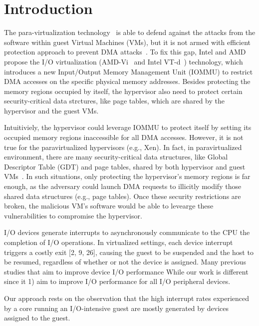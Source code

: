 \section{Introduction} \label{sec:intro}
The para-virtualization technology~\cite{XEN-SOPS03,denali-paravirtualization} is able to defend against the attacks from the software within guest Virtual Machines (VMs), but it is not armed with efficient protection approach to prevent DMA attacks~\cite{disaggregation}. 
To fix this gap, Intel and AMD propose the I/O virtualization (AMD-Vi~\cite{amdvt} and Intel VT-d~\cite{intelvt}) technology, which introduces a new Input/Output Memory Management Unit (IOMMU) to restrict DMA accesses on the specific physical memory addresses. 
Besides protecting the memory regions occupied by itself, the hypervisor also need to protect certain security-critical data strctures, like page tables, which are shared by the hypervisor and the guest VMs.


Intuitiviely, the hypervisor could leverage IOMMU to protect itself by setting its occupied memory regions inaccessible for all DMA accesses. 
However, it is not true for the paravirtualized hypervisors (e.g., Xen). 
In fact, in paravirtualized environment, there are many security-critical data structures, like Global Descriptor Table (GDT) and page tables, shared by both hypervisor and guest VMs~\cite{xxx}. 
In such situations, only protecting the hypervisor's memory regions is far enough, as the adversary could launch DMA requests to illicitly modify those shared data structures (e.g., page tables). 
Once these security restrictions are broken, the malicious VM's software would be able to levearge these vulnerabilities to compromise the hypervisor.


I/O devices generate interrupts to asynchronously communicate
to the CPU the completion of I/O operations. In virtualized settings,
each device interrupt triggers a costly exit [2, 9, 26], causing the
guest to be suspended and the host to be resumed, regardless of
whether or not the device is assigned.
Many previous studies that aim to improve device I/O performance
While our work is different since it 1) aim to improve I/O performance for all I/O peripheral devices.

Our approach rests on the observation that the high interrupt
rates experienced by a core running an I/O-intensive guest are
mostly generated by devices assigned to the guest.

